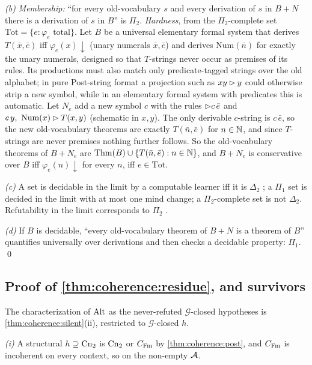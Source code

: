 \emph{(b)} \emph{Membership:} ``for every old-vocabulary $s$ and every derivation of $s$ in $B+N$ there is a derivation of $s$ in $B$'' is $\Pi_2$. \emph{Hardness}, from the $\Pi_2$-complete set $\mathrm{Tot}=\{e:\varphi_e\text{ total}\}$. Let $B$ be a universal elementary formal system that derives $T(\bar x,\bar e)$ iff $\varphi_e(x)\!\downarrow$ (unary numerals $\bar x,\bar e$) and derives $\mathrm{Num}(\bar n)$ for exactly the unary numerals, designed so that $T$-strings never occur as premises of its rules. Its productions must also match only predicate-tagged strings over the old alphabet; in pure Post-string format a projection such as $xy\rhd y$ could otherwise strip a new symbol, while in an elementary formal system with predicates this is automatic. Let $N_e$ add a new symbol $c$ with the rules $\rhd c\,\bar e$ and $c\,y,\ \mathrm{Num}(x)\rhd T(x,y)$ (schematic in $x,y$). The only derivable $c$-string is $c\,\bar e$, so the new old-vocabulary theorems are exactly $T(\bar n,\bar e)$ for $n\in\mathbb{N}$, and since $T$-strings are never premises nothing further follows. So the old-vocabulary theorems of $B+N_e$ are $\mathrm{Thm}(B)\cup\{T(\bar n,\bar e):n\in\mathbb{N}\}$, and $B+N_e$ is conservative over $B$ iff $\varphi_e(n)\!\downarrow$ for every $n$, iff $e\in\mathrm{Tot}$.

\emph{(c)} A set is decidable in the limit by a computable learner iff it is $\Delta_2$ \citep{shoenfield1959degrees,putnam1965trial,gold1965limiting}; a $\Pi_1$ set is decided in the limit with at most one mind change; a $\Pi_2$-complete set is not $\Delta_2$. Refutability in the limit corresponds to $\Pi_2$ \citep{kelly1996logic}.

\emph{(d)} If $B$ is decidable, ``every old-vocabulary theorem of $B+N$ is a theorem of $B$'' quantifies universally over derivations and then checks a decidable property: $\Pi_1$. \qed

\subsection{Proof of \texorpdfstring{\cref{thm:coherence:residue}}{the residue theorem}, and survivors}\label{app:coherence:residue}

The characterization of $\mathrm{Alt}$ as the never-refuted $\mathcal G$-closed hypotheses is \cref{thm:coherence:silent}(ii), restricted to $\mathcal G$-closed $h$.

\emph{(i)} A structural $h\supseteq\mathrm{Cn}_2$ is $\mathrm{Cn}_2$ or $C_{\mathrm{Fm}}$ by \cref{thm:coherence:post}, and $C_{\mathrm{Fm}}$ is incoherent on every context, so on the non-empty $\mathcal{A}$.

